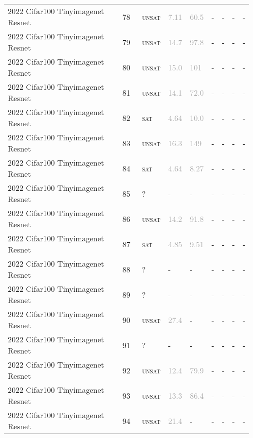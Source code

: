 \begin{center}
{\begin{longtable}{@{}lllllllll@{}}
2022 Cifar100 Tinyimagenet Resnet & 78 & ~\textsc{unsat} & \textcolor{darkgray}{7.11} & \textcolor{darkgray}{60.5} & - & - & - & - \\
2022 Cifar100 Tinyimagenet Resnet & 79 & ~\textsc{unsat} & \textcolor{darkgray}{14.7} & \textcolor{darkgray}{97.8} & - & - & - & - \\
2022 Cifar100 Tinyimagenet Resnet & 80 & ~\textsc{unsat} & \textcolor{darkgray}{15.0} & \textcolor{darkgray}{101} & - & - & - & - \\
2022 Cifar100 Tinyimagenet Resnet & 81 & ~\textsc{unsat} & \textcolor{darkgray}{14.1} & \textcolor{darkgray}{72.0} & - & - & - & - \\
2022 Cifar100 Tinyimagenet Resnet & 82 & ~\textsc{sat} & \textcolor{darkgray}{4.64} & \textcolor{darkgray}{10.0} & - & - & - & - \\
2022 Cifar100 Tinyimagenet Resnet & 83 & ~\textsc{unsat} & \textcolor{darkgray}{16.3} & \textcolor{darkgray}{149} & - & - & - & - \\
2022 Cifar100 Tinyimagenet Resnet & 84 & ~\textsc{sat} & \textcolor{darkgray}{4.64} & \textcolor{darkgray}{8.27} & - & - & - & - \\
2022 Cifar100 Tinyimagenet Resnet & 85 & ~? & - & - & - & - & - & - \\
2022 Cifar100 Tinyimagenet Resnet & 86 & ~\textsc{unsat} & \textcolor{darkgray}{14.2} & \textcolor{darkgray}{91.8} & - & - & - & - \\
2022 Cifar100 Tinyimagenet Resnet & 87 & ~\textsc{sat} & \textcolor{darkgray}{4.85} & \textcolor{darkgray}{9.51} & - & - & - & - \\
2022 Cifar100 Tinyimagenet Resnet & 88 & ~? & - & - & - & - & - & - \\
2022 Cifar100 Tinyimagenet Resnet & 89 & ~? & - & - & - & - & - & - \\
2022 Cifar100 Tinyimagenet Resnet & 90 & ~\textsc{unsat} & \textcolor{darkgray}{27.4} & - & - & - & - & - \\
2022 Cifar100 Tinyimagenet Resnet & 91 & ~? & - & - & - & - & - & - \\
2022 Cifar100 Tinyimagenet Resnet & 92 & ~\textsc{unsat} & \textcolor{darkgray}{12.4} & \textcolor{darkgray}{79.9} & - & - & - & - \\
2022 Cifar100 Tinyimagenet Resnet & 93 & ~\textsc{unsat} & \textcolor{darkgray}{13.3} & \textcolor{darkgray}{86.4} & - & - & - & - \\
2022 Cifar100 Tinyimagenet Resnet & 94 & ~\textsc{unsat} & \textcolor{darkgray}{21.4} & - & - & - & - & - \\

\end{longtable}}
\end{center}
